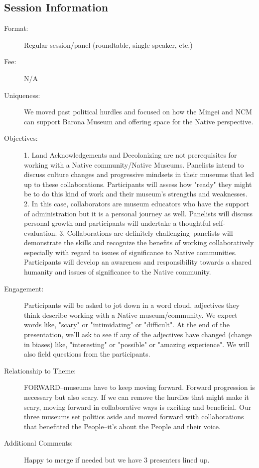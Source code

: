 \documentclass{report}
\begin{document}
              \subsection*{Session Information}
                \begin{description}
                  \item [Format:] Regular session/panel (roundtable, single speaker, etc.)
							    
								  \item [Fee:]N/A
							     
							    \item [Uniqueness:]We moved past political hurdles and focused on how the Mingei and NCM can support Barona Museum and offering space for the Native perspective.
							    \item [Objectives:]1. Land Acknowledgements and Decolonizing are not prerequisites for working with a Native community/Native Museums.  Panelists intend to discuss culture changes and progressive mindsets in their museums that led up to these collaborations.  Participants will assess how "ready" they might be to do this kind of work and their museum's strengths and weaknesses.
2. In this case, collaborators are museum educators who have the support of administration but it is a personal journey as well.  Panelists will discuss personal growth and participants will undertake a thoughtful self-evaluation.
3. Collaborations are definitely challenging--panelists will demonstrate the skills and recognize the benefits of working collaboratively especially with regard to issues of significance to Native communities.  Participants will develop an awareness and responsibility towards a shared humanity and issues of significance to the Native community.
							    \item [Engagement:]Participants will be asked to jot down in a word cloud, adjectives they think describe working with a Native museum/community.  We expect words like, "scary" or "intimidating" or "difficult".  At the end of the presentation, we'll ask to see if any of the adjectives have changed (change in biases) like, "interesting" or "possible" or "amazing experience".  We will also field questions from the participants.
							    \item [Relationship to Theme:]FORWARD--museums have to keep moving forward.  Forward progression is necessary but also scary.  If we can remove the hurdles that might make it scary, moving forward in collaborative ways is exciting and beneficial.  Our three museums set politics aside and moved forward with collaborations that benefitted the People--it's about the People and their voice.
							    
                    \item [Additional Comments: ]Happy to merge if needed but we have 3 presenters lined up.

                \end{description}
\end{document}

